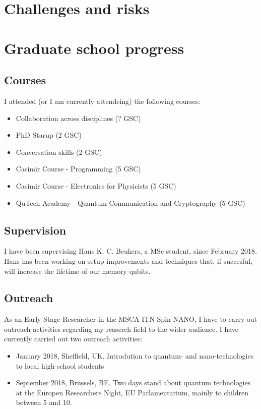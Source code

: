\documentclass[a4paper]{article}
\begin{document}
\section{Challenges and risks}

\section{Graduate school progress}
\subsection{Courses}
I attended (or I am currently attendeing) the following courses:
\begin{itemize}
	\item Collaboration across disciplines (? GSC) %
	\item PhD Starup (2 GSC)
	\item Conversation skills (2 GSC)
	\item Casimir Course - Programming (5 GSC)
	\item Casimir Course - Electronics for Physicists (5 GSC)
	\item QuTech Academy - Quantum Communication and Cryptography (5 GSC)
\end{itemize}

\subsection{Supervision}
I have been supervising Hans K. C. Beukers, a MSc student, since February 2018. Hans has been working on setup improvements and techniques that, if succesful, will increase the lifetime of our memory qubits.

\subsection{Outreach}
As an Early Stage Researcher in the MSCA ITN Spin-NANO, I have to carry out outreach activities regarding my reaserch field to the wider audience. I have currently carried out two outreach activities:
\begin{itemize}
	\item January 2018, Sheffield, UK. Introdution to quantum- and nano-technologies to local high-school students
	\item September 2018, Brussels, BE. Two days stand about quantum technologies at the Europen Researchers Night, EU Parlamentarium, mainly to children between 5 and 10.
\end{itemize}
\end{document}
